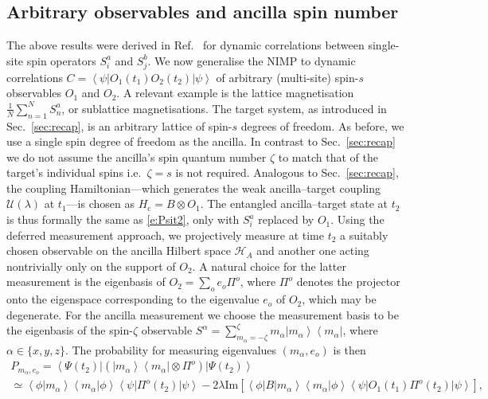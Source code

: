 \documentclass[epjST,numbook]{svjour}
\newcommand\CC{{\mathds{C}}}
\newcommand{\couple}{\mathscr{U}}
\newcommand{\ket}[1]{\left \vert #1 \right >}
\newcommand{\bra}[1]{\left < #1 \right \vert}
\newcommand{\matel}[3]{ \displaystyle \left\langle #1 \right \vert #2 \left\vert  #3 \right\rangle }
\newcommand{\innprod}[2]{ \displaystyle \left\langle #1 \vert #2 \right\rangle }
\newcommand{\impart}[1]{\text{Im}\left[ #1 \right]}
\begin{document}
\subsection{Arbitrary observables and ancilla spin number}
\label{sec:arbObs}
The above results were derived in Ref.~\cite{Uhrich_etal} for dynamic correlations between single-site spin operators $S_i^a$ and $S_j^b$.
We now generalise the NIMP to dynamic correlations $C=\matel{\psi}{O_1(t_1) O_2(t_2)}{\psi}$ of arbitrary (multi-site) spin-$s$ observables $O_1$ and $O_2$. A relevant example is the lattice magnetisation $\frac{1}{N}\sum_{n=1}^N S_n^a$, or sublattice magnetisations. The target system, as introduced in Sec.~\ref{sec:recap}, is an arbitrary lattice of spin-$s$ degrees of freedom.
As before, we use a single spin degree of freedom as the ancilla. In contrast to Sec.~\ref{sec:recap} we do not assume the ancilla's spin quantum number $\zeta$ to match that of the target's individual spins i.e.\ $\zeta=s$ is not required. Analogous to Sec.~\ref{sec:recap}, the coupling Hamiltonian---which generates the weak ancilla--target coupling $\couple(\lambda)$ at $t_1$---is chosen as $H_{\text{c}}=B\otimes O_1$. The entangled ancilla--target state at $t_2$ is thus formally the same as \eqref{e:Psit2}, only with $S^a_i$ replaced by $O_1$. %
Using the deferred measurement approach, we projectively measure at time $t_2$ a suitably chosen observable on the ancilla Hilbert space $\mathscr{H}_A$ and another one acting nontrivially only on the support of $O_2$. A natural choice for the latter measurement is the eigenbasis of ${O_2=\sum_{o}e_o\Pi^o}$, where $\Pi^o$ denotes the projector onto the eigenspace corresponding to the eigenvalue $e_o$ of $O_2$, which may be degenerate. For the ancilla measurement we choose the measurement basis to be the eigenbasis of the \mbox{spin-$\zeta$} observable $S^\alpha=\sum_{m_\alpha=-\zeta}^\zeta m_\alpha \ket{m_\alpha}\!\bra{m_\alpha}$, where $\alpha\in \{x,y,z\}$. The probability for measuring eigenvalues $(m_\alpha,e_o)$ is then
\begin{multline}
		P_{m_\alpha, e_o} = \matel{\Psi(t_2)}{(\ket{m_\alpha}\!\bra{m_\alpha}\otimes \Pi^o)}{\Psi(t_2)} \\
		\simeq \innprod{\phi}{m_\alpha}\innprod{m_\alpha}{\phi}\matel{\psi}{\Pi^o(t_2)}{\psi} -2\lambda \impart{\matel{\phi}{B}{m_\alpha}\innprod{m_\alpha}{\phi}\matel{\psi}{O_1(t_1)\Pi^o(t_2)}{\psi} },
	\end{multline}
\end{document}
